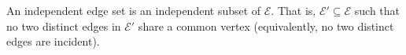 An independent edge set is an independent subset of $\mathcal{E}$. That is, $\mathcal{E}' \subseteq \mathcal{E}$ such that no two distinct edges in $\mathcal{E}'$ share a common vertex (equivalently, no two distinct edges are incident).
